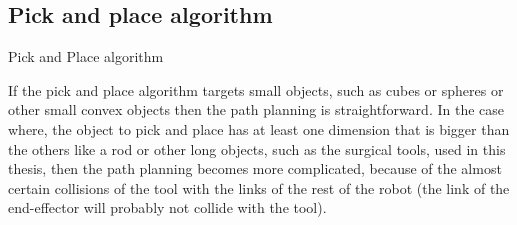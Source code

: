 \subsection{Pick and place algorithm}

\begin{algorithm}[H]
\SetAlgoLined
{}
\caption{Pick and Place algorithm}
\end{algorithm}

If the pick and place algorithm targets small objects, such as cubes or spheres or other small convex objects then the path planning is straightforward. In the case where, the object to pick and place has at least one 
dimension that is bigger than the others like a rod or other long objects, such as the surgical tools, used in this thesis, then the path planning becomes more complicated, because of the almost certain collisions 
of the tool with the links of the rest of the robot (the link of the end-effector will probably not collide with the tool).